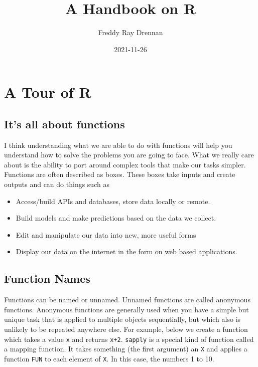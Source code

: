 \documentclass[
]{book}
\title{A Handbook on R}
\author{Freddy Ray Drennan}
\date{2021-11-26}
\providecommand{\tightlist}{%
  \setlength{\itemsep}{0pt}\setlength{\parskip}{0pt}}
\begin{document}
\maketitle

{
\setcounter{tocdepth}{1}
\tableofcontents
}
\hypertarget{a-tour-of-r}{%
\chapter{A Tour of R}\label{a-tour-of-r}}

\hypertarget{its-all-about-functions}{%
\section{It's all about functions}\label{its-all-about-functions}}

I think understanding what we are able to do with functions will help you understand how to solve the problems you are going to face. What we really care about is the ability to port around complex tools that make our tasks simpler. Functions are often described as boxes. These boxes take inputs and create outputs and can do things such as

\begin{itemize}
\tightlist
\item
  Access/build APIs and databases, store data locally or remote.
\item
  Build models and make predictions based on the data we collect.
\item
  Edit and manipulate our data into new, more useful forms
\item
  Display our data on the internet in the form on web based applications.
\end{itemize}

\hypertarget{function-names}{%
\section{Function Names}\label{function-names}}

Functions can be named or unnamed. Unnamed functions are called anonymous functions. Anonymous functions are generally used when you have a simple but unique task that is applied to multiple objects sequentially, but which also is unlikely to be repeated anywhere else. For example, below we create a function which takes a value \texttt{x} and returns \texttt{x+2}. \texttt{sapply} is a special kind of function called a mapping function. It takes something (the first argument) an \texttt{X} and applies a function \texttt{FUN} to each element of \texttt{X}. In this case, the numbers 1 to 10.
\end{document}
